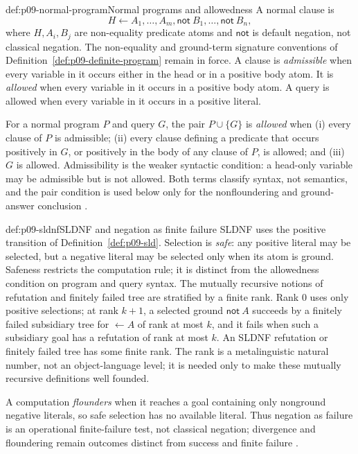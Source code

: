 \begin{hbdefinition}{def:p09-normal-program}{Normal programs and allowedness}
A normal clause is
\[
 H\leftarrow A_1,\ldots,A_m,
   \mathsf{not}\ B_1,\ldots,\mathsf{not}\ B_n,
\]
where \(H,A_i,B_j\) are non-equality predicate atoms and \(\mathsf{not}\) is
default negation, not classical negation.  The non-equality and ground-term
signature conventions of Definition~\ref{def:p09-definite-program} remain in
force.  A clause is \emph{admissible} when every variable in it occurs either
in the head or in a positive body atom.  It is \emph{allowed} when every
variable in it occurs in a positive body atom.  A query is allowed when every
variable in it occurs in a positive literal.

For a normal program \(P\) and query \(G\), the pair \(P\cup\{G\}\) is
\emph{allowed} when (i) every clause of \(P\) is admissible; (ii) every clause
defining a predicate that occurs positively in \(G\), or positively in the body
of any clause of \(P\), is allowed; and (iii) \(G\) is allowed.  Admissibility is
the weaker syntactic condition: a head-only variable may be admissible but is
not allowed.  Both terms classify syntax, not semantics, and the pair condition
is used below only for the nonfloundering and ground-answer conclusion
\cite[\S15, pp.~88--90]{Lloyd1987}.
\end{hbdefinition}

\begin{hbdefinition}{def:p09-sldnf}{SLDNF and negation as finite failure}
SLDNF uses the positive transition of
Definition~\ref{def:p09-sld}.  Selection is \emph{safe}: any positive literal
may be selected, but a negative literal may be selected only when its atom is
ground.  Safeness restricts the computation rule; it is distinct from the
allowedness condition on program and query syntax.  The mutually recursive
notions of refutation and finitely failed tree are stratified by a finite rank.
Rank \(0\) uses only positive selections; at rank \(k+1\), a selected ground
\(\mathsf{not}\ A\) succeeds by a finitely failed subsidiary tree for
\(\leftarrow A\) of rank at most \(k\), and it fails when such a subsidiary
goal has a refutation of rank at most \(k\).  An SLDNF refutation or finitely
failed tree has some finite rank.  The rank is a metalinguistic natural number,
not an object-language level; it is needed only to make these mutually recursive
definitions well founded.

A computation \emph{flounders} when it reaches a goal containing only
nonground negative literals, so safe selection has no available literal.  Thus
negation as failure is an operational finite-failure test, not classical
negation; divergence and floundering remain outcomes distinct from success and
finite failure \cite[\S15, pp.~84--89]{Lloyd1987}.
\end{hbdefinition}

